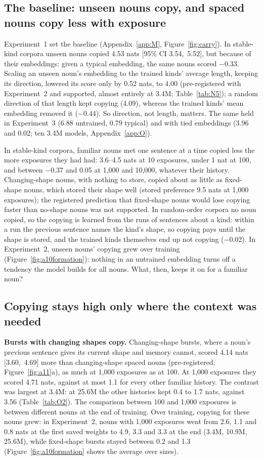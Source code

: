 \documentclass[11pt]{article}
\begin{document}
\subsection{The baseline: unseen nouns copy, and spaced nouns copy less with exposure}\label{sec:rows}
Experiment~1 set the baseline (Appendix~\ref{app:M}, Figure~\ref{fig:carry}). In stable-kind corpora unseen nouns copied 4.53 nats [95\% CI 3.54,~5.52], but because of their embeddings: given a typical embedding, the same nouns scored $-$0.33. Scaling an unseen noun's embedding to the trained kinds' average length, keeping its direction, lowered its score only by 0.52 nats, to 4.00 (pre-registered with Experiment~2 and supported, almost entirely at 3.4M; Table~\ref{tab:N5}); a random direction of that length kept copying (4.09), whereas the trained kinds' mean embedding removed it ($-$0.44). So direction, not length, matters. The same held in Experiment~3 (6.88 untrained, 0.79 typical) and with tied embeddings (3.96 and 0.02; ten 3.4M models, Appendix~\ref{app:O}).

In stable-kind corpora, familiar nouns met one sentence at a time copied less the more exposures they had had: 3.6--4.5 nats at 10 exposures, under 1 nat at 100, and between $-$0.37 and 0.05 at 1,000 and 10,000, whatever their history. Changing-shape nouns, with nothing to store, copied about as little as fixed-shape nouns, which stored their shape well (stored preference 9.5 nats at 1,000 exposures); the registered prediction that fixed-shape nouns would lose copying faster than no-shape nouns was not supported. In random-order corpora no noun copied, so the copying is learned from the runs of sentences about a kind: within a run the previous sentence names the kind's shape, so copying pays until the shape is stored, and the trained kinds themselves end up not copying ($-$0.02). In Experiment~2, unseen nouns' copying grew over training (Figure~\ref{fig:a10formation}): nothing in an untrained embedding turns off a tendency the model builds for all nouns. What, then, keeps it on for a familiar noun?

\subsection{Copying stays high only where the context was needed}\label{sec:bursts}
\textbf{Bursts with changing shapes copy.} Changing-shape bursts, where a noun's previous sentence gives its current shape and memory cannot, scored 4.14 nats [3.60,~4.69] more than changing-shape spaced nouns (pre-registered; Figure~\ref{fig:a11}a), as much at 1,000 exposures as at 100. At 1,000 exposures they scored 4.71 nats, against at most 1.1 for every other familiar history. The contrast was largest at 3.4M: at 25.6M the other histories kept 0.4 to 1.7 nats, against 3.56 (Table~\ref{tab:O2}). The comparison between 100 and 1,000 exposures is between different nouns at the end of training. Over training, copying for these nouns grew: in Experiment~2, nouns with 1,000 exposures went from 2.6, 1.1 and 0.8 nats at the first saved weights to 4.9, 3.3 and 3.3 at the end (3.4M, 10.9M, 25.6M), while fixed-shape bursts stayed between 0.2 and 1.3 (Figure~\ref{fig:a10formation} shows the average over sizes).
\end{document}
